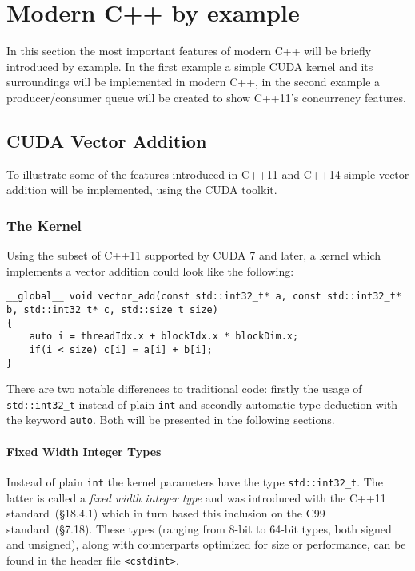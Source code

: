\section{Modern C++ by example}

In this section the most important features of modern C++ will be briefly introduced by example. In the first example a simple CUDA kernel and its surroundings will be implemented in modern C++, in the second example a producer/consumer queue will be created to show C++11's concurrency features. 

\subsection{CUDA Vector Addition}

To illustrate some of the features introduced in C++11 and C++14 simple vector addition will be implemented, using the CUDA toolkit.

\subsubsection{The Kernel}

Using the subset of C++11 supported by CUDA 7 and later, a kernel which implements a vector addition could look like the following:

\begin{lstlisting}
__global__ void vector_add(const std::int32_t* a, const std::int32_t* b, std::int32_t* c, std::size_t size)
{
    auto i = threadIdx.x + blockIdx.x * blockDim.x;
    if(i < size) c[i] = a[i] + b[i];
}
\end{lstlisting}

There are two notable differences to traditional code: firstly the usage of \texttt{std::int32\_t} instead of plain \texttt{int} and secondly automatic type deduction with the keyword \texttt{auto}. Both will be presented in the following sections.

\paragraph{Fixed Width Integer Types}

Instead of plain \texttt{int} the kernel parameters have the type \texttt{std::int32\_t}. The latter is called a \textit{fixed width integer type} and was introduced with the C++11 standard~\cite{cpp11std}(§18.4.1) which in turn based this inclusion on the C99 standard~\cite{c99std}(§7.18). These types (ranging from 8-bit to 64-bit types, both signed and unsigned), along with counterparts optimized for size or performance, can be found in the header file \texttt{<cstdint>}.

